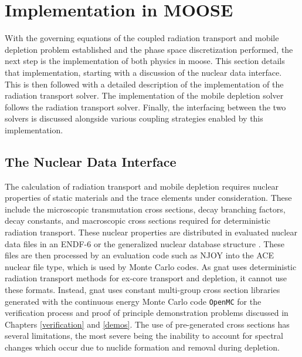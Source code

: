 \section{Implementation in MOOSE}
\label{solver:implementation}

With the governing equations of the coupled radiation transport and mobile depletion problem established and the phase space discretization performed, the next step is the implementation of both physics in \acrshort{moose}. This section details that implementation, starting with a discussion of the nuclear data interface. This is then followed with a detailed description of the implementation of the radiation transport solver. The implementation of the mobile depletion solver follows the radiation transport solver. Finally, the interfacing between the two solvers is discussed alongside various coupling strategies enabled by this implementation.

\subsection{The Nuclear Data Interface}
\label{solver:implementation:data}

The calculation of radiation transport and mobile depletion requires nuclear properties of static materials and the trace elements under consideration. These include the microscopic transmutation cross sections, decay branching factors, decay constants, and macroscopic cross sections required for deterministic radiation transport. These nuclear properties are distributed in evaluated nuclear data files in an ENDF-6 or the generalized nuclear database structure \cite{endf_b_8}. These files are then processed by an evaluation code such as NJOY \cite{njoy} into the ACE nuclear file type, which is used by Monte Carlo codes. As \acrshort{gnat} uses deterministic radiation transport methods for ex-core transport and depletion, it cannot use these formats. Instead, \acrshort{gnat} uses constant multi-group cross section libraries generated with the continuous energy Monte Carlo code \texttt{OpenMC} \cite{openmc} for the verification process and proof of principle demonstration problems discussed in Chapters \ref{verification} and \ref{demos}. The use of pre-generated cross sections has several limitations, the most severe being the inability to account for spectral changes which occur due to nuclide formation and removal during depletion. 

